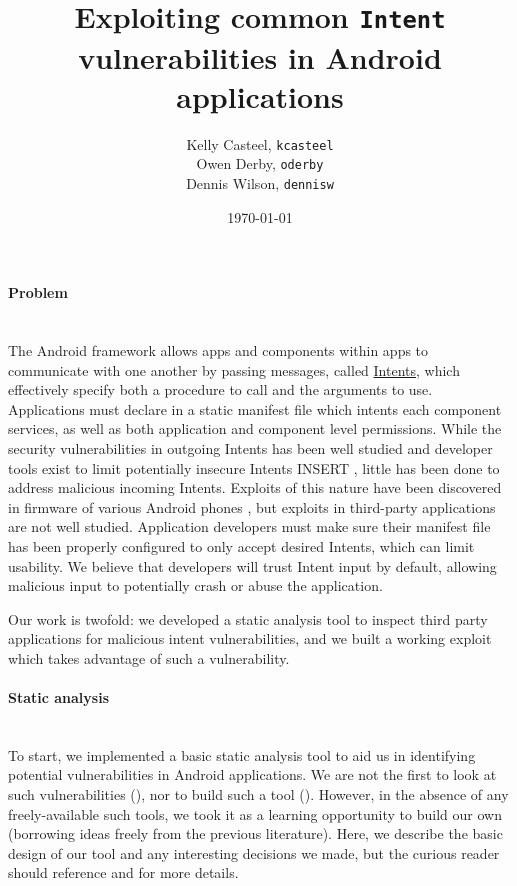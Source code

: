 \documentclass[12pt,a4paper]{article}
\title{Exploiting common \texttt{Intent} vulnerabilities in Android %
applications}
\date{\today}
\author{Kelly Casteel, \texttt{kcasteel}\\Owen Derby, \texttt{oderby}\\Dennis
 Wilson, \texttt{dennisw}}
\begin{document}
 

\maketitle

\paragraph{Problem} ~\\

The Android framework allows apps and components within apps to communicate with
one another by passing messages, called
\href{https://developer.android.com/reference/android/content/Intent.html}{Intents},
which effectively specify both a procedure to call and the arguments to
use. Applications must declare in a static manifest file which intents each
component services, as well as both application and component level
permissions. While the security vulnerabilities in outgoing Intents has been
well studied \cite{chin_analyzing_2011} and developer tools exist to limit
potentially insecure Intents INSERT \cite{citation_needed!!!}, little has been
done to address malicious incoming Intents. Exploits of this nature have been
discovered in firmware of various Android phones \cite{grace_systematic_2012},
but exploits in third-party applications are not well studied. Application
developers must make sure their manifest file has been properly configured to
only accept desired Intents, which can limit usability. We believe that
developers will trust Intent input by default, allowing malicious input to
potentially crash or abuse the application.

Our work is twofold: we developed a static analysis tool to inspect third party
applications for malicious intent vulnerabilities, and we built a working
exploit which takes advantage of such a vulnerability.

\paragraph{Static analysis} ~\\

To start, we implemented a basic static analysis tool to aid us in identifying
potential vulnerabilities in Android applications. We are not the first to look
at such vulnerabilities (\cite{chin_analyzing_2011}), nor to build such a tool
(\cite{grace_systematic_2012}). However, in the absence of any freely-available
such tools, we took it as a learning opportunity to build our own (borrowing
ideas freely from the previous literature). Here, we describe the basic design
of our tool and any interesting decisions we made, but the curious reader should
reference \cite{chin_analyzing_2011} and \cite{grace_systematic_2012} for more
details.
\end{document}
